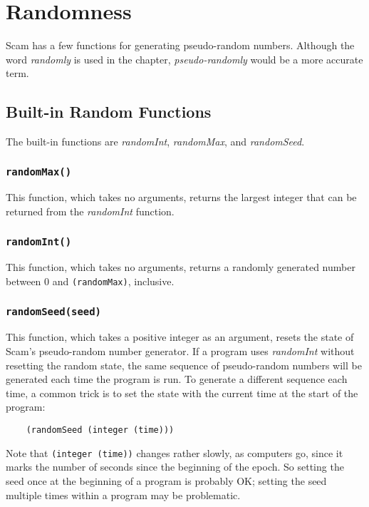 \chapter{Randomness}
\label{Randomness}

Scam has a few functions for generating pseudo-random numbers.
Although the word {\it randomly} is used in the chapter,
{\it pseudo-randomly}
would be a more accurate term.

\section{Built-in Random Functions}

The built-in functions are
{\it randomInt}, {\it randomMax}, and {\it randomSeed}.

\subsection*{{\tt randomMax()}}

This function, which takes no arguments, returns the largest
integer
that can be returned from the {\it randomInt} function.

\subsection*{{\tt randomInt()}}

This function, which takes no arguments,
returns a randomly generated number between 0
and \verb!(randomMax)!, inclusive.

\subsection*{{\tt randomSeed(seed)}}

This function, which takes a positive integer as an
argument, resets the state of Scam's pseudo-random number
generator. If a program uses {\it randomInt} without resetting the
random state, the same sequence of pseudo-random numbers will
be generated each time the program is run. To generate a
different sequence each time, a common trick is to set the
state with the current time at the start of the program:

\begin{verbatim}
    (randomSeed (integer (time)))
\end{verbatim}

Note that \verb!(integer (time))! changes rather slowly, as computers go, since
it marks the number of seconds since the beginning of the epoch.
So setting the seed once at the beginning of a program is probably
OK; setting the seed multiple times within a program may be problematic.

